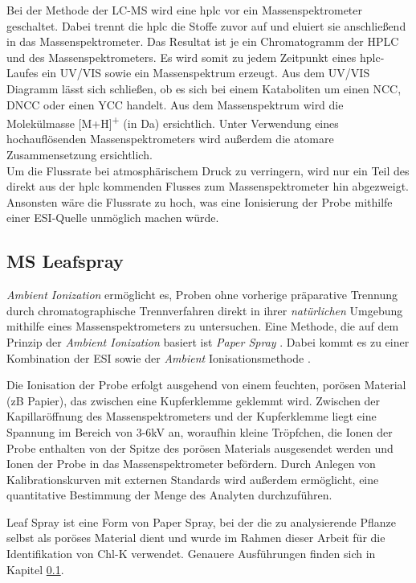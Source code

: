 Bei der Methode der LC-MS wird eine \gls{hplc} vor ein Massenspektrometer geschaltet. Dabei trennt die \gls{hplc} die Stoffe zuvor auf und eluiert sie anschließend in das Massenspektrometer. \cite[S. 217-218]{MassSpectrometry} Das Resultat ist je ein Chromatogramm der HPLC und des Massenspektrometers. Es wird somit zu jedem Zeitpunkt eines \gls{hplc}-Laufes ein UV/VIS sowie ein Massenspektrum erzeugt. Aus dem UV/VIS Diagramm lässt sich schließen, ob es sich bei einem Kataboliten um einen \gls{NCC}, \gls{DNCC} oder einen \gls{YCC} handelt. Aus dem Massenspektrum wird die Molekülmasse [M+H]\textsuperscript{+} (in Da) ersichtlich. Unter Verwendung eines hochauflösenden Massenspektrometers wird außerdem die atomare Zusammensetzung ersichtlich. \\

Um die Flussrate bei atmosphärischem Druck zu verringern, wird nur ein Teil des direkt aus der \gls{hplc} kommenden Flusses zum Massenspektrometer hin abgezweigt. Ansonsten wäre die Flussrate zu hoch, was eine Ionisierung der Probe mithilfe einer \gls{ESI}-Quelle unmöglich machen würde. \cite[S. 221]{MassSpectrometry}


\subsection{MS Leafspray} \label{sec:MSLeafspray}

\textit{Ambient Ionization} \cite{AmbientIonisation} ermöglicht es, Proben ohne vorherige präparative Trennung durch chromatographische Trennverfahren direkt in ihrer \textit{natürlichen} Umgebung mithilfe eines Massenspektrometers zu untersuchen. Eine Methode, die auf dem Prinzip der \textit{Ambient Ionization} basiert ist \textit{Paper Spray} \cite{PaperSpray}. Dabei  kommt es zu einer Kombination der \gls{ESI} sowie der \textit{Ambient} Ionisationsmethode \cite{PaperSpray}. 

Die Ionisation der Probe erfolgt ausgehend von einem feuchten, porösen Material (\gls{zB} Papier), das zwischen eine Kupferklemme geklemmt wird. Zwischen der Kapillaröffnung des Massenspektrometers und der Kupferklemme liegt eine Spannung im Bereich von 3-6kV an, woraufhin kleine Tröpfchen, die Ionen der Probe enthalten von der Spitze des porösen Materials ausgesendet werden und Ionen der Probe in das Massenspektrometer befördern. \cite{RapidScreeningLeafSpray} Durch Anlegen von Kalibrationskurven mit externen Standards wird außerdem ermöglicht, eine quantitative Bestimmung der Menge des Analyten durchzuführen. \cite{LeafSpray}

Leaf Spray ist eine Form von Paper Spray, bei der die zu analysierende Pflanze selbst als poröses Material dient und wurde im Rahmen dieser Arbeit für die Identifikation von \gls{Chl-K} verwendet. Genauere Ausführungen finden sich in Kapitel \ref{sec:MSLeafspray}.

